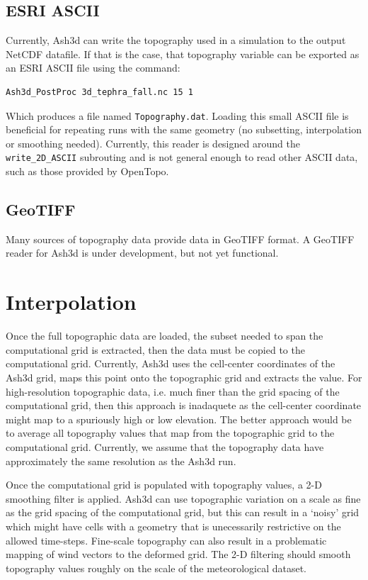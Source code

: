\subsection{ESRI ASCII}
Currently, Ash3d can write the topography used in a simulation to the output NetCDF
datafile. If that is the case, that topography variable can be exported as an
ESRI ASCII file using the command:
\small
\begin{verbatim}
Ash3d_PostProc 3d_tephra_fall.nc 15 1
\end{verbatim}
\normalsize
Which produces a file named \texttt{Topography.dat}.
Loading this small ASCII file is beneficial for repeating runs with the same geometry
(no subsetting, interpolation or smoothing needed). Currently, this reader is
designed around the \texttt{write\_2D\_ASCII} subrouting and is not general enough to 
read other ASCII data, such as those provided by OpenTopo.
\subsection{GeoTIFF}
Many sources of topography data provide data in GeoTIFF format. A GeoTIFF reader for
Ash3d is under development, but not yet functional.

\section{Interpolation}\label{ChapAppendTopo_Sec_Interp}
Once the full topographic data are loaded, the subset needed to span the computational grid is
extracted, then the data must be copied to the computational grid. Currently, Ash3d uses
the cell-center coordinates of the Ash3d grid, maps this point onto the topographic
grid and extracts the value. For high-resolution topographic data, i.e. much finer than the
grid spacing of the computational grid, then this approach is inadaquete as the cell-center
coordinate might map to a spuriously high or low elevation. The better approach would be
to average all topography values that map from the topographic grid to the computational
grid. Currently, we assume that the topography data have approximately the same resolution
as the Ash3d run.

Once the computational grid is populated with topography values, a 2-D smoothing filter
is applied. Ash3d can use topographic variation on a scale as fine as the grid spacing of
the computational grid, but this can result in a `noisy' grid which might have cells with
a geometry that is unecessarily restrictive on the allowed time-steps. Fine-scale
topography can also result in a problematic mapping of wind vectors to the deformed grid.
The 2-D filtering should smooth topography values roughly on the scale of the 
meteorological dataset.

